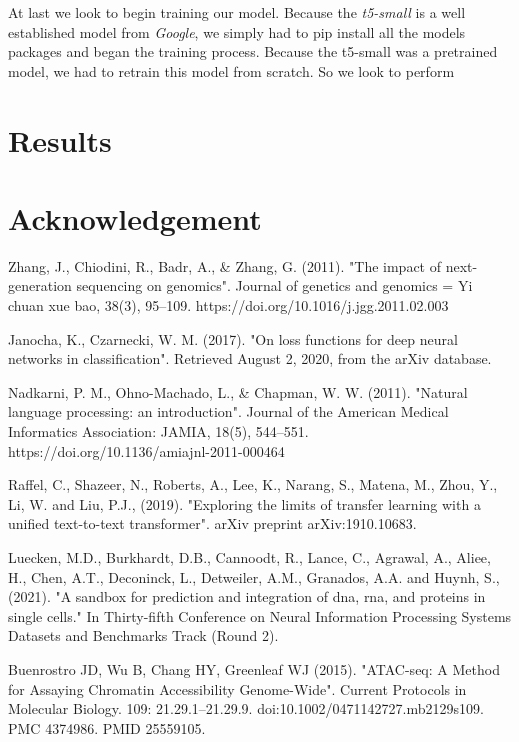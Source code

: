 At last we look to begin training our model. Because the \emph{t5-small} is a well established model from \emph{Google}, we simply had to pip install all the models packages and began the training process. Because the t5-small was a pretrained model, we had to retrain this model from scratch. So we look to perform 

\section{Results}

\section{Acknowledgement}

\begin{thebibliography}{25}

 Zhang, J., Chiodini, R., Badr, A., \& Zhang, G. (2011). "The impact of next-generation sequencing on genomics". Journal of genetics and genomics = Yi chuan xue bao, 38(3), 95–109. https://doi.org/10.1016/j.jgg.2011.02.003

 Janocha, K., Czarnecki, W. M. (2017). "On loss functions for deep neural networks in classification". Retrieved August 2, 2020, from the arXiv database.

 Nadkarni, P. M., Ohno-Machado, L., \& Chapman, W. W. (2011). "Natural language processing: an introduction". Journal of the American Medical Informatics Association: JAMIA, 18(5), 544–551. https://doi.org/10.1136/amiajnl-2011-000464

 Raffel, C., Shazeer, N., Roberts, A., Lee, K., Narang, S., Matena, M., Zhou, Y., Li, W. and Liu, P.J., (2019). "Exploring the limits of transfer learning with a unified text-to-text transformer". arXiv preprint arXiv:1910.10683.

 Luecken, M.D., Burkhardt, D.B., Cannoodt, R., Lance, C., Agrawal, A., Aliee, H., Chen, A.T., Deconinck, L., Detweiler, A.M., Granados, A.A. and Huynh, S., (2021). "A sandbox for prediction and integration of dna, rna, and proteins in single cells." In Thirty-fifth Conference on Neural Information Processing Systems Datasets and Benchmarks Track (Round 2).

 Buenrostro JD, Wu B, Chang HY, Greenleaf WJ (2015). "ATAC-seq: A Method for Assaying Chromatin Accessibility Genome-Wide". Current Protocols in Molecular Biology. 109: 21.29.1–21.29.9. doi:10.1002/0471142727.mb2129s109. PMC 4374986. PMID 25559105.


\end{thebibliography}
